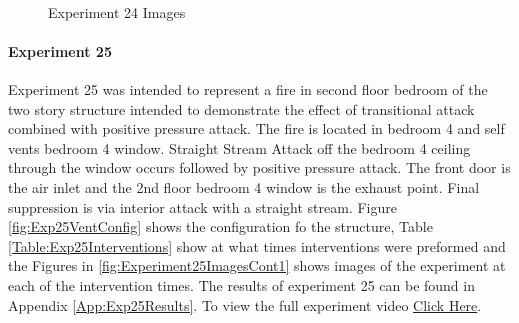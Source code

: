 \documentclass{article}
\begin{document}
\clearpage

\begin{figure}[H]
	\ContinuedFloat 
	\centering 
	 \ 
	\caption{Experiment 24 Images}
	\label{fig:Experiment24ImagesCont3} 
\end{figure}

\paragraph{Experiment 25}\mbox{}

Experiment 25 was intended to represent a fire in second floor bedroom of the two story structure intended to demonstrate the effect of transitional attack combined with positive pressure attack. The fire is located in bedroom 4 and self vents bedroom 4 window. Straight Stream Attack off the bedroom 4 ceiling through the window occurs followed by positive pressure attack. The front door is the air inlet and the 2nd floor bedroom 4 window is the exhaust point. Final suppression is via interior attack with a straight stream. Figure \ref{fig:Exp25VentConfig} shows the configuration fo the structure, Table \ref{Table:Exp25Interventions} show at what times interventions were preformed and the Figures in \ref{fig:Experiment25ImagesCont1} shows images of the experiment at each of the intervention times. The results of experiment 25 can be found in Appendix \ref{App:Exp25Results}. To view the full experiment video \href{https://youtu.be/vMflFNnWxHU}{Click Here}.
\end{document}
